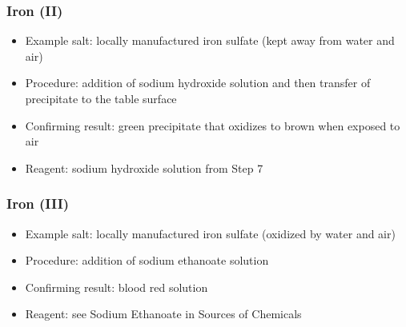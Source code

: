 \subsubsection{Iron (II)}
\begin{itemize}
\item{Example salt: locally manufactured iron sulfate 
(kept away from water and air)}
\item{Procedure: addition of sodium hydroxide solution 
and then transfer of precipitate to the table surface}
\item{Confirming result: green precipitate 
that oxidizes to brown when exposed to air}
\item{Reagent: sodium hydroxide solution from Step 7}
\end{itemize}

\subsubsection{Iron (III)}
\begin{itemize}
\item{Example salt: locally manufactured iron sulfate 
(oxidized by water and air)}
\item{Procedure: addition of sodium ethanoate solution}
\item{Confirming result: blood red solution}
\item{Reagent: see Sodium Ethanoate in Sources of Chemicals}
\end{itemize}

